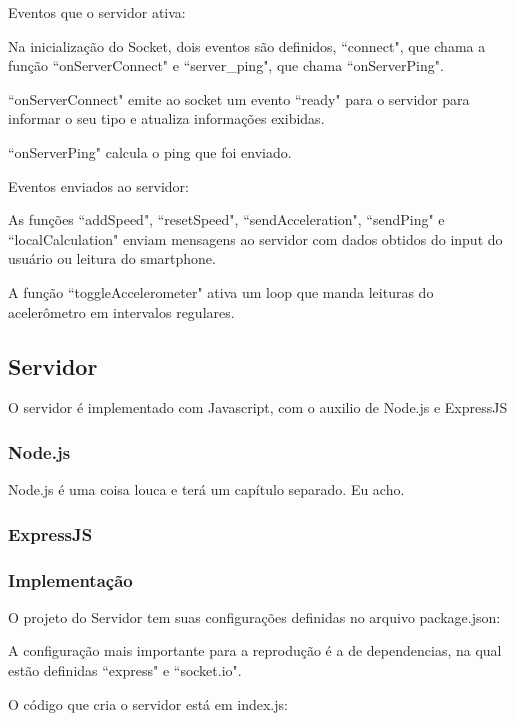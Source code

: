 \documentclass[a4paper,12pt]{article}
\begin{document}
Eventos que o servidor ativa:

Na inicialização do Socket, dois eventos são definidos, “connect", que chama a função “onServerConnect" e “server\_ping", que chama “onServerPing".

“onServerConnect" emite ao socket um evento “ready" para o servidor para informar o seu tipo e atualiza informações exibidas.

“onServerPing" calcula o ping que foi enviado.


Eventos enviados ao servidor:

As funções “addSpeed", “resetSpeed", “sendAcceleration", “sendPing" e “localCalculation" enviam mensagens ao servidor com dados obtidos do input do usuário ou leitura do smartphone.

A função “toggleAccelerometer" ativa um loop que manda leituras do acelerômetro em intervalos regulares.


\newpage
\subsection{Servidor}

O servidor é implementado com Javascript, com o auxilio de Node.js e ExpressJS

\subsubsection{Node.js}

Node.js é uma coisa louca e terá um capítulo separado. Eu acho.

\subsubsection{ExpressJS}

\subsubsection{Implementação}

O projeto do Servidor tem suas configurações definidas no arquivo package.json:


A configuração mais importante para a reprodução é a de dependencias, na qual estão definidas “express" e “socket.io".

O código que cria o servidor está em index.js:
\end{document}

